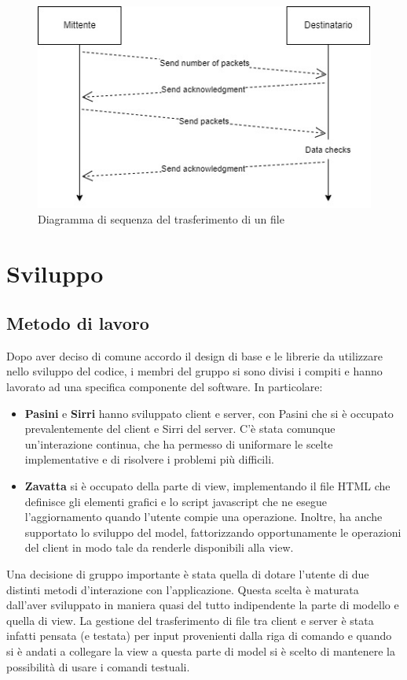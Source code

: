 \documentclass[a4paper,12pt]{report}
\begin{document}
\begin{figure}[H]
    \centering
    \includegraphics[scale=0.55]{img/transfer.jpg}
    \caption{Diagramma di sequenza del trasferimento di un file}
\end{figure}

\chapter{Sviluppo}

\section{Metodo di lavoro}
Dopo aver deciso di comune accordo il design di base e le librerie da utilizzare nello sviluppo del codice, i membri del gruppo si sono divisi i compiti e hanno lavorato ad una specifica componente del software. In particolare:
\begin{itemize}
    \item \textbf{Pasini} e \textbf{Sirri} hanno sviluppato client e server, con Pasini che si è occupato prevalentemente del client e Sirri del server. C'è stata comunque un'interazione continua, che ha permesso di uniformare le scelte implementative e di risolvere i problemi più difficili.  
    \item \textbf{Zavatta} si è occupato della parte di view, implementando il file HTML che definisce gli elementi grafici e lo script javascript che ne esegue l'aggiornamento quando l'utente compie una operazione. Inoltre, ha anche supportato lo sviluppo del model, fattorizzando opportunamente le operazioni del client in modo tale da renderle disponibili alla view.
\end{itemize}

Una decisione di gruppo importante è stata quella di dotare l'utente di due distinti metodi d'interazione con l'applicazione. Questa scelta è maturata dall'aver sviluppato in maniera quasi del tutto indipendente la parte di modello e quella di view.
La gestione del trasferimento di file tra client e server è stata infatti pensata (e testata) per input provenienti dalla riga di comando e quando si è andati a collegare la view a questa parte di model si è scelto di mantenere la possibilità di usare i comandi testuali.
\end{document}
